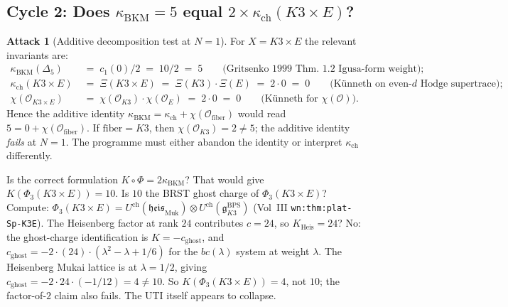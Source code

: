 \documentclass[11pt]{article}
\theoremstyle{definition}
\newtheorem{attack}[theorem]{Attack}
\newcommand{\kch}{\kappa_{\mathrm{ch}}}
\newcommand{\kBKM}{\kappa_{\mathrm{BKM}}}
\newcommand{\chir}{\mathrm{ch}}
\begin{document}
\subsection{Cycle 2: Does $\kBKM = 5$ equal $2 \times \kch(K3 \times E)$?}

\begin{attack}[Additive decomposition test at $N = 1$]
For $X = K3 \times E$ the relevant invariants are:
\begin{align*}
   \kBKM(\Delta_5) &\;=\; c_1(0)/2 \;=\; 10/2 \;=\; 5
     \qquad\text{(Gritsenko 1999 Thm.~1.2 Igusa-form weight)}; \\
   \kch(K3 \times E) &\;=\; \Xi(K3 \times E)
     \;=\; \Xi(K3) \cdot \Xi(E) \;=\; 2 \cdot 0 \;=\; 0
     \qquad\text{(K\"unneth on even-$d$ Hodge supertrace)}; \\
   \chi(\mathcal{O}_{K3 \times E}) &\;=\; \chi(\mathcal{O}_{K3})
     \cdot \chi(\mathcal{O}_E) \;=\; 2 \cdot 0 \;=\; 0
     \qquad\text{(K\"unneth for $\chi(\mathcal{O})$)}.
\end{align*}
Hence the additive identity $\kBKM = \kch + \chi(\mathcal{O}_{\mathrm{fiber}})$
would read $5 = 0 + \chi(\mathcal{O}_{\mathrm{fiber}})$. If
$\mathrm{fiber} = K3$, then $\chi(\mathcal{O}_{K3}) = 2 \neq 5$; the
additive identity \emph{fails} at $N = 1$. The programme must either
abandon the identity or interpret $\kch$ differently.

Is the correct formulation $K \circ \Phi = 2 \kBKM$? That would give
$K(\Phi_3(K3 \times E)) = 10$. Is $10$ the BRST ghost charge of
$\Phi_3(K3 \times E)$? Compute: $\Phi_3(K3 \times E) = U^{\chir}(\mathfrak{heis}_{\mathrm{Muk}})
\otimes U^{\chir}(\mathfrak{g}^{\mathrm{BPS}}_{K3})$ (Vol~III
\texttt{wn:thm:plat-Sp-K3E}). The Heisenberg factor at rank $24$ contributes
$c = 24$, so $K_{\mathrm{Heis}} = 24$? No: the ghost-charge identification
is $K = -c_{\mathrm{ghost}}$, and $c_{\mathrm{ghost}} = -2 \cdot (24) \cdot
(\lambda^2 - \lambda + 1/6)$ for the $bc(\lambda)$ system at weight
$\lambda$. The Heisenberg Mukai lattice is at $\lambda = 1/2$, giving
$c_{\mathrm{ghost}} = -2 \cdot 24 \cdot (-1/12) = 4 \neq 10$. So
$K(\Phi_3(K3 \times E)) = 4$, not $10$; the factor-of-$2$ claim also fails.
The UTI itself appears to collapse.
\end{attack}
\end{document}
